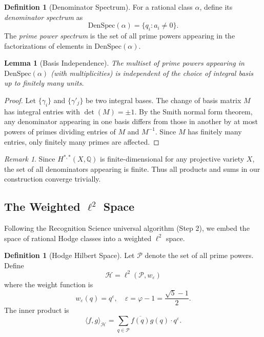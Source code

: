 \documentclass[12pt]{article}
\newtheorem{lemma}[theorem]{Lemma}
\theoremstyle{definition}
\newtheorem{definition}[theorem]{Definition}
\theoremstyle{remark}
\newtheorem{remark}[theorem]{Remark}
\begin{document}
\begin{definition}[Denominator Spectrum]
For a rational class $\alpha$, define its \emph{denominator spectrum} as
\[
\text{DenSpec}(\alpha) = \{q_i : a_i \neq 0\}.
\]
The \emph{prime power spectrum} is the set of all prime powers appearing in the factorizations of elements in $\text{DenSpec}(\alpha)$.
\end{definition}

\begin{lemma}[Basis Independence]
\label{lem:basis-indep}
The multiset of prime powers appearing in $\text{DenSpec}(\alpha)$ (with multiplicities) is independent of the choice of integral basis up to finitely many units.
\end{lemma}

\begin{proof}
Let $\{\gamma_i\}$ and $\{\gamma'_j\}$ be two integral bases. The change of basis matrix $M$ has integral entries with $\det(M) = \pm 1$. By the Smith normal form theorem, any denominator appearing in one basis differs from those in another by at most powers of primes dividing entries of $M$ and $M^{-1}$. Since $M$ has finitely many entries, only finitely many primes are affected.
\end{proof}

\begin{remark}
Since $H^{*,*}(X,\mathbb{Q})$ is finite-dimensional for any projective variety $X$, the set of all denominators appearing is finite. Thus all products and sums in our construction converge trivially.
\end{remark}

\subsection{The Weighted $\ell^2$ Space}

Following the Recognition Science universal algorithm (Step 2), we embed the space of rational Hodge classes into a weighted $\ell^2$ space.

\begin{definition}[Hodge Hilbert Space]
Let $\mathcal{P}$ denote the set of all prime powers. Define
\[
\mathcal{H} = \ell^2(\mathcal{P}, w_\varepsilon)
\]
where the weight function is
\[
w_\varepsilon(q) = q^\varepsilon, \quad \varepsilon = \varphi - 1 = \frac{\sqrt{5} - 1}{2}.
\]
The inner product is
\[
\langle f, g \rangle_{\mathcal{H}} = \sum_{q \in \mathcal{P}} \overline{f(q)} g(q) \cdot q^\varepsilon.
\]
\end{definition}
\end{document}
